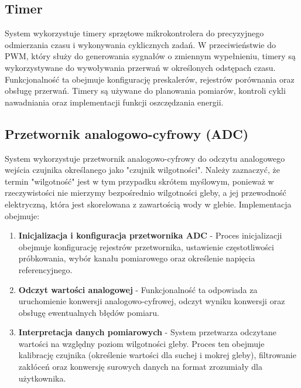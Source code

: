 \documentclass{article}
\begin{document}
\subsection{Timer}
System wykorzystuje timery sprzętowe mikrokontrolera do precyzyjnego odmierzania czasu i wykonywania cyklicznych zadań. W przeciwieństwie do PWM, który służy do generowania sygnałów o zmiennym wypełnieniu, timery są wykorzystywane do wywoływania przerwań w określonych odstępach czasu. Funkcjonalność ta obejmuje konfigurację preskalerów, rejestrów porównania oraz obsługę przerwań. Timery są używane do planowania pomiarów, kontroli cykli nawadniania oraz implementacji funkcji oszczędzania energii.

\subsection{Przetwornik analogowo-cyfrowy (ADC)}
System wykorzystuje przetwornik analogowo-cyfrowy do odczytu analogowego wejścia czujnika określanego jako "czujnik wilgotności". Należy zaznaczyć, że termin "wilgotność" jest w tym przypadku skrótem myślowym, ponieważ w rzeczywistości nie mierzymy bezpośrednio wilgotności gleby, a jej przewodność elektryczną, która jest skorelowana z zawartością wody w glebie. Implementacja obejmuje:

\begin{enumerate}
    \item \textbf{Inicjalizacja i konfiguracja przetwornika ADC} - Proces inicjalizacji obejmuje konfigurację rejestrów przetwornika, ustawienie częstotliwości próbkowania, wybór kanału pomiarowego oraz określenie napięcia referencyjnego.
    
    \item \textbf{Odczyt wartości analogowej} - Funkcjonalność ta odpowiada za uruchomienie konwersji analogowo-cyfrowej, odczyt wyniku konwersji oraz obsługę ewentualnych błędów pomiaru.
    
    \item \textbf{Interpretacja danych pomiarowych} - System przetwarza odczytane wartości na względny poziom wilgotności gleby. Proces ten obejmuje kalibrację czujnika (określenie wartości dla suchej i mokrej gleby), filtrowanie zakłóceń oraz konwersję surowych danych na format zrozumiały dla użytkownika.
\end{enumerate}
\end{document}

